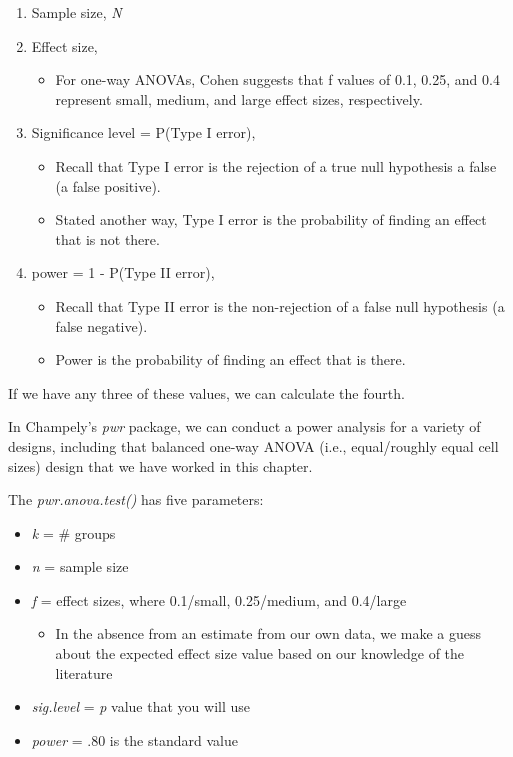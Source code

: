 \documentclass[
  english,
]{book}
\providecommand{\tightlist}{%
  \setlength{\itemsep}{0pt}\setlength{\parskip}{0pt}}
\begin{document}
\begin{enumerate}
\def\labelenumi{\arabic{enumi}.}
\tightlist
\item
  Sample size, \emph{N}
\item
  Effect size,

  \begin{itemize}
  \tightlist
  \item
    For one-way ANOVAs, Cohen suggests that f values of 0.1, 0.25, and 0.4 represent small, medium, and large effect sizes, respectively.
  \end{itemize}
\item
  Significance level = P(Type I error),

  \begin{itemize}
  \tightlist
  \item
    Recall that Type I error is the rejection of a true null hypothesis a false (a false positive).
  \item
    Stated another way, Type I error is the probability of finding an effect that is not there.
  \end{itemize}
\item
  power = 1 - P(Type II error),

  \begin{itemize}
  \tightlist
  \item
    Recall that Type II error is the non-rejection of a false null hypothesis (a false negative).
  \item
    Power is the probability of finding an effect that is there.
  \end{itemize}
\end{enumerate}

If we have any three of these values, we can calculate the fourth.

In Champely's \emph{pwr} package, we can conduct a power analysis for a variety of designs, including that balanced one-way ANOVA (i.e., equal/roughly equal cell sizes) design that we have worked in this chapter.

The \emph{pwr.anova.test()} has five parameters:

\begin{itemize}
\tightlist
\item
  \emph{k} = \# groups
\item
  \emph{n} = sample size
\item
  \emph{f} = effect sizes, where 0.1/small, 0.25/medium, and 0.4/large

  \begin{itemize}
  \tightlist
  \item
    In the absence from an estimate from our own data, we make a guess about the expected effect size value based on our knowledge of the literature
  \end{itemize}
\item
  \emph{sig.level} = \emph{p} value that you will use
\item
  \emph{power} = .80 is the standard value
\end{itemize}
\end{document}
